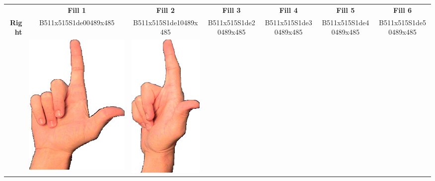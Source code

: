 \documentclass{article}
\begin{document}
\begin{center}
\begin{tabular}{r*{6}{c}}
&\textbf{Fill 1}&\textbf{Fill 2}&\textbf{Fill 3}&\textbf{Fill 4}&\textbf{Fill 5}&\textbf{Fill 6}\\
\multirow{2}{*}{\textbf{Right}}&
B511x515S1de00489x485&
B511x515S1de10489x485&
B511x515S1de20489x485&
B511x515S1de30489x485&
B511x515S1de40489x485&
B511x515S1de50489x485\\
&
\includegraphics[scale=0.1]{images/09-03-1.jpg}&
\includegraphics[scale=0.1]{images/09-03-2.jpg}&

\end{tabular}
\end{center}
\end{document}
